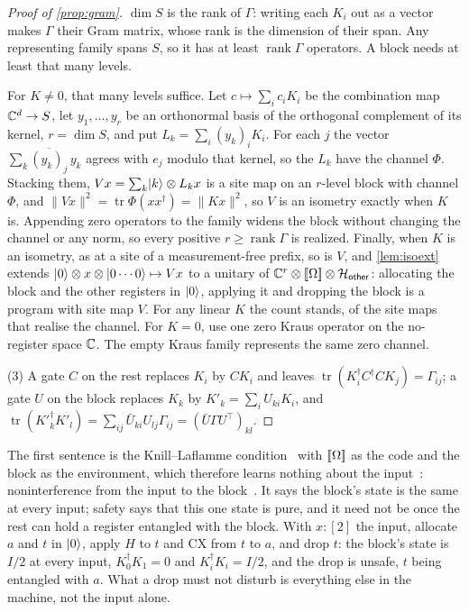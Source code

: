 \documentclass[acmsmall,screen,review,anonymous,nonacm]{acmart}
\begin{document}
\begin{proof}[Proof of \cref{prop:gram}]
$\dim S$ is the rank of $\Gamma$: writing each $K_i$ out as a vector makes $\Gamma$ their
Gram matrix, whose rank is the dimension of their span.
Any representing family spans $S$, so it has at least
$\operatorname{rank}\Gamma$ operators. A block needs at least that many levels.

For $K\ne0$, that many levels suffice. Let $c \mapsto \sum_i c_iK_i$ be the combination map
$\mathbb{C}^{d} \to S$, let $y_1, \ldots, y_r$ be an orthonormal basis of the orthogonal
complement of its kernel, $r = \dim S$, and put $L_k = \sum_i (y_k)_i K_i$.
For each $j$ the vector $\sum_k \overline{(y_k)_j}\,y_k$ agrees with $e_j$ modulo that
kernel, so the $L_k$ have the channel $\Phi$.
Stacking them, $Vx = \sum_k \lvert k \rangle \otimes L_kx$ is a site map on an $r$-level block with
channel $\Phi$, and $\lVert Vx\rVert^{2} = \operatorname{tr}\Phi(xx^{\dagger}) =
\lVert Kx\rVert^{2}$, so $V$ is an isometry exactly when $K$ is.
Appending zero operators to the family widens the block without changing the channel or
any norm, so every positive $r\ge\operatorname{rank}\Gamma$ is realized.
Finally, when $K$ is an isometry, as at a site of a measurement-free prefix, so is $V$,
and \cref{lem:isoext} extends $\lvert 0 \rangle \otimes x \otimes \lvert 0\cdots0 \rangle \mapsto Vx$
to a unitary of $\mathbb{C}^{r} \otimes [\![\Omega]\!] \otimes \mathcal{H}_{\mathsf{other}}$: allocating the block and the
other registers in $\lvert 0 \rangle$, applying it and dropping the block is a program with site
map $V$. For any linear $K$ the count stands, of the site maps that realise the channel.
For $K=0$, use one zero Kraus operator on the no-register space $\mathbb{C}$.
The empty Kraus family represents the same zero channel.

(3) A gate $C$ on the rest replaces $K_i$ by $CK_i$ and leaves
$\operatorname{tr}(K_i^{\dagger}C^{\dagger}CK_j) = \Gamma_{ij}$; a gate $U$
on the block replaces $K_k$ by $K'_k = \sum_i U_{ki}K_i$, and
$\operatorname{tr}(K'^{\dagger}_kK'_l) = \sum_{ij}\bar U_{ki}U_{lj}
\Gamma_{ij} = (\bar U \Gamma U^{\top})_{kl}$.
\end{proof}

\stmtScalar

The first sentence is the Knill--Laflamme
condition~\cite{Knill1997Theory} with $[\![\Omega]\!]$ as the code and the
block as the environment, which therefore learns nothing about the
input~\cite{Kretschmann2008Tradeoff}: noninterference from the input to the
block~\cite{Goguen1982Security,Ying2013Noninterference}. It says the block's
state is the same at every input; safety says that this one state is pure,
and it need not be once the rest can hold a register entangled with the block.
With $x : [2]$ the input, allocate $a$ and $t$ in $\lvert 0 \rangle$, apply $H$ to $t$
and $\mathrm{CX}$ from $t$ to $a$, and drop $t$: the block's state is $I/2$
at every input, $K_0^{\dagger}K_1 = 0$ and $K_i^{\dagger}K_i = I/2$, and the
drop is unsafe, $t$ being entangled with $a$. What a drop must not disturb is
everything else in the machine, not the input alone.
\end{document}
